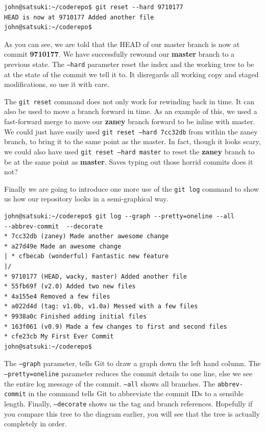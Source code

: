 \begin{Verbatim}
john@satsuki:~/coderepo$ git reset --hard 9710177
HEAD is now at 9710177 Added another file
john@satsuki:~/coderepo$ 
\end{Verbatim}

As you can see, we are told that the HEAD of our master branch is now at commit \textbf{9710177}.  We have successfully rewound our \textbf{master} branch to a previous state.  The \texttt{--hard} parameter reset the index and the working tree to be at the state of the commit we tell it to.  It disregards all working copy and staged modifications, so use it with care.

The \texttt{git reset} command does not only work for rewinding back in time.  It can also be used to move a branch forward in time.  As an example of this, we used a fast-forward merge to move our \textbf{zaney} branch forward to be inline with master.  We could just have easily used \texttt{git reset --hard 7cc32db} from within the zaney branch, to bring it to the same point as the master.  In fact, though it looks scary, we could also have used \texttt{git reset --hard master} to reset the \textbf{zaney} branch to be at the same point as \textbf{master}.  Saves typing out those horrid commits does it not?

Finally we are going to introduce one more use of the \texttt{git log} command to show us how our repository looks in a semi-graphical way.

\begin{Verbatim}
john@satsuki:~/coderepo$ git log --graph --pretty=oneline --all 
--abbrev-commit  --decorate
* 7cc32db (zaney) Made another awesome change
* a27d49e Made an awesome change
| * cfbecab (wonderful) Fantastic new feature
|/  
* 9710177 (HEAD, wacky, master) Added another file
* 55fb69f (v2.0) Added two new files
* 4a155e4 Removed a few files
* a022d4d (tag: v1.0b, v1.0a) Messed with a few files
* 9938a0c Finished adding initial files
* 163f061 (v0.9) Made a few changes to first and second files
* cfe23cb My First Ever Commit
john@satsuki:~/coderepo$ 

\end{Verbatim}

The \texttt{--graph} parameter, tells Git to draw a graph down the left hand column.  The \texttt{--pretty=oneline} parameter reduces the commit details to one line, else we see the entire log message of the commit.  \texttt{--all} shows all branches.  The \texttt{abbrev-commit} in the command tells Git to abbreviate the commit IDs to a sensible length.  Finally, \texttt{--decorate} shows us the tag and branch references.  Hopefully if you compare this tree to the diagram earlier, you will see that the tree is actually completely in order.

